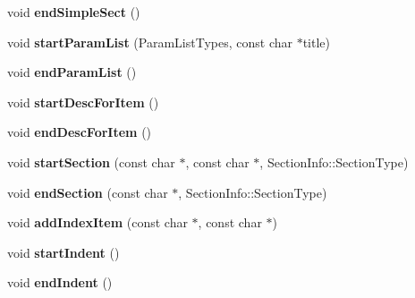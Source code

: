 \begin{DoxyCompactItemize}
\item 
\hypertarget{class_man_generator_a845408bbcbfed31523c20fd170dd8b45}{void {\bfseries end\-Simple\-Sect} ()}\label{class_man_generator_a845408bbcbfed31523c20fd170dd8b45}

\item 
\hypertarget{class_man_generator_a1f8233d3d8c28205b99a8fd06ecdad02}{void {\bfseries start\-Param\-List} (Param\-List\-Types, const char $\ast$title)}\label{class_man_generator_a1f8233d3d8c28205b99a8fd06ecdad02}

\item 
\hypertarget{class_man_generator_a0cea756e6f65da408378bedffe2b67d1}{void {\bfseries end\-Param\-List} ()}\label{class_man_generator_a0cea756e6f65da408378bedffe2b67d1}

\item 
\hypertarget{class_man_generator_aaeedab997793b96cdfc94f8b628d5a80}{void {\bfseries start\-Desc\-For\-Item} ()}\label{class_man_generator_aaeedab997793b96cdfc94f8b628d5a80}

\item 
\hypertarget{class_man_generator_a5cae5c5213649bfad6105e91ac818870}{void {\bfseries end\-Desc\-For\-Item} ()}\label{class_man_generator_a5cae5c5213649bfad6105e91ac818870}

\item 
\hypertarget{class_man_generator_a32fffbabcb45b670e3a6ac0471b99c50}{void {\bfseries start\-Section} (const char $\ast$, const char $\ast$, Section\-Info\-::\-Section\-Type)}\label{class_man_generator_a32fffbabcb45b670e3a6ac0471b99c50}

\item 
\hypertarget{class_man_generator_ab32c634e6ee9223b4c5d77b1e3d8c082}{void {\bfseries end\-Section} (const char $\ast$, Section\-Info\-::\-Section\-Type)}\label{class_man_generator_ab32c634e6ee9223b4c5d77b1e3d8c082}

\item 
\hypertarget{class_man_generator_a6a680849ac320b2cbb670773aa5c9feb}{void {\bfseries add\-Index\-Item} (const char $\ast$, const char $\ast$)}\label{class_man_generator_a6a680849ac320b2cbb670773aa5c9feb}

\item 
\hypertarget{class_man_generator_a34fb23b9705fd9c97bfb8730b5667822}{void {\bfseries start\-Indent} ()}\label{class_man_generator_a34fb23b9705fd9c97bfb8730b5667822}

\item 
\hypertarget{class_man_generator_a3e925c49464a35005365e14899e6c0a8}{void {\bfseries end\-Indent} ()}\label{class_man_generator_a3e925c49464a35005365e14899e6c0a8}


\end{DoxyCompactItemize}
